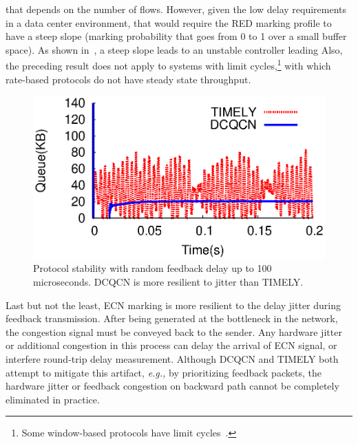 that depends on the number of flows. However, given the low delay
requirements in a data center environment, that would require the RED
marking profile to have a steep slope (marking probability that goes
from 0 to 1 over a small buffer space). As shown
in~\cite{misra:TAC2002}, a steep slope leads to an unstable
controller leading 
Also, the preceding result does not apply to systems with
limit cycles,\footnote{Some window-based protocols have limit cycles~\cite{dctcp-analysis}.} 
with which rate-based protocols do not have steady state throughput.

\begin{figure}
\center
\includegraphics[width=0.7\columnwidth]{figures/variable_delay.eps}
\vspace{-1em}
\caption{Protocol stability with random feedback delay up to 100 microseconds. 
DCQCN is more resilient to jitter than TIMELY.}
\label{fig:variable_delay}
\end{figure}

Last but not the least, ECN marking is more resilient to the delay jitter during feedback 
transmission. After being generated at the bottleneck in the network, the congestion signal must
be conveyed back to the sender. Any hardware jitter or additional congestion in this process 
can delay the arrival of ECN signal, or interfere round-trip delay measurement.
Although DCQCN and TIMELY both attempt to mitigate this artifact, {\em e.g.,} by prioritizing
feedback packets, the hardware jitter or feedback congestion on backward path cannot be 
completely eliminated in practice. 

